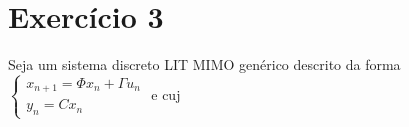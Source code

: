     \section*{Exercício 3}
    \label{ex:3}
    
Seja um sistema discreto LIT MIMO genérico descrito da forma $\begin{cases} x_{n+1} = \Phi x_n + \Gamma u_n \\ y_n = C x_n \end{cases}$ e cuj
